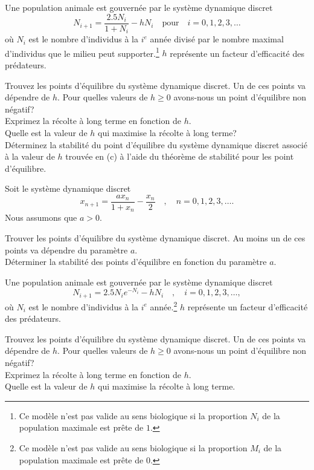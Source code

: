 \begin{question}[\life]
Une population animale est gouvernée par le système dynamique discret
\[
N_{i+1} = \frac{2.5 N_i}{1+N_i} - h N_i \quad \text{pour}
\quad i=0, 1, 2, 3,\ldots
\]
où $N_i$ est le nombre d'individus à la $i^e$ année divisé par le nombre
maximal d'individus que le milieu peut supporter.\footnote{Ce
modèle n'est pas valide au sens biologique si la proportion $N_i$ de
la population maximale est prête de $1$.}  $h$ représente un
facteur d'efficacité des prédateurs.

 Trouvez les points d'équilibre du système dynamique discret.  Un de
ces points va dépendre de $h$.  Pour quelles valeurs de $h\geq 0$
avons-nous un point d'équilibre non négatif?\\
 Exprimez la récolte à long terme en fonction de $h$.\\
 Quelle est la valeur de $h$ qui maximise la récolte à long
terme?\\
 Déterminez la stabilité du point d'équilibre du système dynamique
discret associé à la valeur de $h$ trouvée en (c) à l'aide du
théorème de stabilité pour les point d'équilibre.
\label{6Q120}
\end{question}

\begin{question}
Soit le système dynamique discret
\[
x_{n+1} = \frac{a x_n}{1+x_n} - \frac{x_n}{2} \quad , \quad n=0, 1, 2,
3, \ldots .
\]
Nous assumons que $a>0$.

 Trouver les points d'équilibre du système dynamique
discret.  Au moins un de ces points va dépendre du paramètre $a$.\\
 Déterminer la stabilité des points d'équilibre en
fonction du paramètre $a$.
\label{6Q121}
\end{question}

\begin{question}[\life]
Une population animale est gouvernée par le système dynamique discret
\[
N_{i+1} = 2.5 N_i e^{-N_i} - h N_i \quad , \quad i=0, 1, 2, 3,\ldots ,
\]
où $N_i$ est le nombre d'individus à la $i^e$ année.\footnote{Ce
modèle n'est pas valide au sens biologique si la proportion $M_i$ de
la population maximale est prête de $0$.}  $h$ représente un
facteur d'efficacité des prédateurs.

 Trouvez les points d'équilibre du système dynamique discret.  Un de
ces points va dépendre de $h$.  Pour quelles valeurs de $h\geq 0$
avons-nous un point d'équilibre non négatif?\\
 Exprimez la récolte à long terme en fonction de $h$.\\
 Quelle est la valeur de $h$ qui maximise la récolte à long terme.
\label{6Q122}
\end{question}

